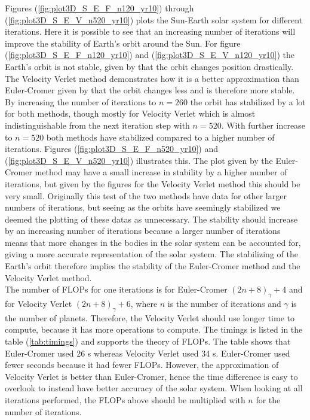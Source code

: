 \documentclass{article}
\begin{document}
    Figures (\ref{fig:plot3D_S_E_F_n120_yr10}) through (\ref{fig:plot3D_S_E_V_n520_yr10}) plots the Sun-Earth solar system for different iterations. Here it is possible to see that an increasing number of iterations will improve the stability of Earth's orbit around the Sun.
    For figure (\ref{fig:plot3D_S_E_F_n120_yr10}) and (\ref{fig:plot3D_S_E_V_n120_yr10}) the Earth's orbit is not stable, given by that the orbit changes position drastically. The Velocity Verlet method demonstrates how it is a better approximation than Euler-Cromer given by that the orbit changes less and is therefore more stable. By increasing the number of iterations to $n = 260$ the orbit has stabilized by a lot for both methods, though mostly for Velocity Verlet which is almost indistinguishable from the next iteration step with $n = 520$. With further increase to $n = 520$ both methods have stabilized compared to a higher number of iterations.
    Figures (\ref{fig:plot3D_S_E_F_n520_yr10}) and (\ref{fig:plot3D_S_E_V_n520_yr10}) illustrates this. The plot given by the Euler-Cromer method may have a small increase in stability by a higher number of iterations, but given by the figures for the Velocity Verlet method this should be very small. Originally this test of the two methods have data for other larger numbers of iterations, but seeing as the orbits have seemingly stabilized we deemed the plotting of these datas as unnecessary.
    The stability should increase by an increasing number of iterations because a larger number of iterations means that more changes in the bodies in the solar system can be accounted for, giving a more accurate representation of the solar system. The stabilizing of the Earth's orbit therefore implies the stability of the Euler-Cromer method and the Velocity Verlet method. \\

    The number of FLOPs for one iterations is for Euler-Cromer $(2n + 8)_\gamma + 4$ and for Velocity Verlet $(2n + 8)_\gamma + 6$, where $n$ is the number of iterations and $\gamma$ is the number of planets. Therefore, the Velocity Verlet should use longer time to compute, because it has more operations to compute. The timings is listed in the table (\ref{tab:timings}) and supports the theory of FLOPs. The table shows that Euler-Cromer used 26 s whereas Velocity Verlet used 34 s. Euler-Cromer used fewer seconds because it had fewer FLOPs. However, the approximation of Velocity Verlet is better than Euler-Cromer, hence the time difference is easy to overlook to instead have better accuracy of the solar system. When looking at all iterations performed, the FLOPs above should be multiplied with $n$ for the number of iterations. \\
\end{document}
